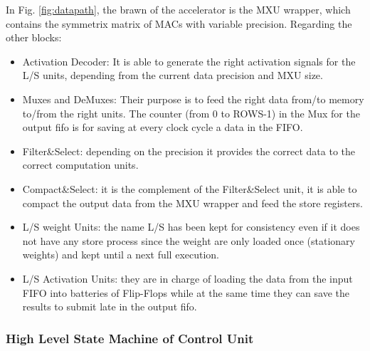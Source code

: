 In Fig. \ref{fig:datapath}, the brawn of the accelerator is the MXU wrapper, which contains the symmetrix matrix of MACs with variable precision. Regarding the other blocks:
\begin{itemize}
\item Activation Decoder: It is able to generate the right activation signals for the L/S units, depending from the current data precision and MXU size.
\item Muxes and DeMuxes: Their purpose is to feed the right data from/to memory to/from the right units. The counter (from 0 to ROWS-1) in the Mux for the output fifo is for saving at every clock cycle a data in the FIFO.
\item Filter\&Select: depending on the precision it provides the correct data to the correct computation units.
\item Compact\&Select: it is the complement of the Filter\&Select unit, it is able to compact the output data from the MXU wrapper and feed the store registers.
\item L/S weight Units: the name L/S has been kept for consistency even if it does not have any store process since the weight are only loaded once (stationary weights) and kept until a next full execution. 
\item L/S Activation Units:  they are in charge of loading the data from the input FIFO into batteries of Flip-Flops while at the same time they can save the results to submit late in the output fifo.
\end{itemize}

\subsubsection{High Level State Machine of Control Unit}


